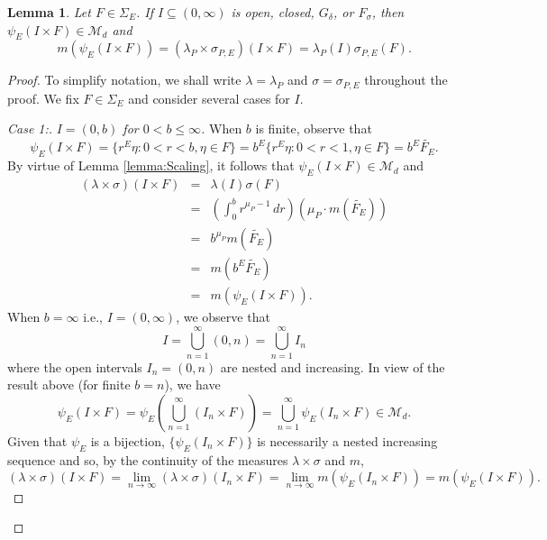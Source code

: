 \documentclass[11pt]{article}
\newtheorem{lemma}[theorem]{Lemma}
\theoremstyle{remark}
\newcommand*{\myproofname}{Proof}
\newenvironment{subproof}[1][\myproofname]{\begin{proof}[#1]\renewcommand*{\qedsymbol}{$\mathbin{/\mkern-6mu/}$}}{\end{proof}}
\begin{document}
\begin{lemma}\label{lem:SpecialRectangle}
Let $F\in\Sigma_E$. If $I\subseteq (0,\infty)$ is open, closed, $G_\delta$, or $F_\sigma$, then $\psi_E(I\times F)\in\mathcal{M}_d$ and
\begin{equation}\label{eq:SpecialRectangle}
m(\psi_E(I\times F))=(\lambda_P\times\sigma_{P,E})(I\times F)=\lambda_P(I)\sigma_{P,E}(F).
\end{equation}
\end{lemma}
\begin{proof}
To simplify notation, we shall write $\lambda=\lambda_P$ and $\sigma=\sigma_{P,E}$ throughout the proof. We fix $F\in\Sigma_E$ and consider several cases for $I$.

\begin{subproof}[Case 1:]\textit{$I=(0,b)$ for $0<b\leq \infty$.} When $b$ is finite, observe that
\begin{equation*}
\psi_E(I\times F)=\{r^E\eta:0<r<b,\eta\in F\}=b^E\{r^E\eta:0<r<1,\eta \in F\}=b^E\widetilde{F_E}.
\end{equation*}
By virtue of Lemma \ref{lemma:Scaling}, it follows that $\psi_E(I\times F)\in\mathcal{M}_d$ and
\begin{eqnarray*}
(\lambda\times\sigma)(I\times F)&=&\lambda(I)\sigma(F)\\
&=&\left(\int_0^b r^{\mu_P-1}\,dr\right)\left(\mu_P\cdot m(\widetilde{F_E})\right)\\
&=&b^{\mu_P}m(\widetilde{F_E})\\
&=&m(b^{E}\widetilde{F_E})\\
&=&m(\psi_E(I\times F)).
\end{eqnarray*}
When $b=\infty$ i.e., $I=(0,\infty)$, we observe that
\begin{equation*}
I=\bigcup_{n=1}^\infty (0,n)=\bigcup_{n=1}^\infty I_n
\end{equation*}
where the open intervals $I_n=(0,n)$ are nested and increasing. In view of the result above (for finite $b=n$), we have
\begin{equation*}\psi_E(I\times F)=\psi_E\left(\bigcup_{n=1}^\infty (I_n\times F)\right)=\bigcup_{n=1}^\infty\psi_E(I_n\times F)\in\mathcal{M}_d.
\end{equation*}
Given that $\psi_E$ is a bijection, $\{\psi_E(I_n\times F)\}$ is necessarily a nested increasing sequence and so, by the continuity of the measures $\lambda\times\sigma$ and $m$,
\begin{equation*}
(\lambda\times\sigma)(I\times F)=\lim_{n\to\infty}(\lambda\times\sigma)(I_n\times F)=\lim_{n\to\infty}m(\psi_E(I_n\times F))= m(\psi_E(I\times F)). 
\end{equation*}
\end{subproof}


\end{proof}
\end{document}
